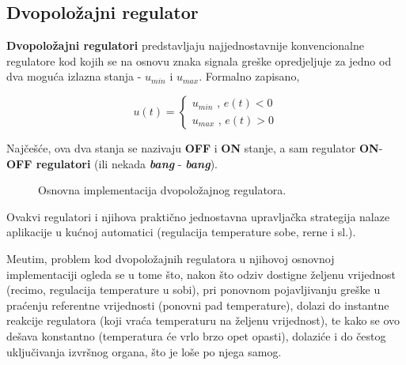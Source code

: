 \documentclass[12pt]{IEEEtran}
\numberwithin{equation}{subsection}
\numberwithin{figure}{section}
\begin{document}
\subsection{\textbf{Dvopolo\v{z}ajni regulator}}

\textbf{Dvopolo\v{z}ajni regulatori} predstavljaju najjednostavnije
konvencionalne regulatore kod kojih se na osnovu znaka signala gre\v{s}ke
opredjeljuje za jedno od dva mogu\'{c}a izlazna stanja - $u_{min}$ i $u_{max}$.
Formalno zapisano,

\begin{equation}
    u(t) = \begin{cases}
        u_{min} \text{ , } e(t) < 0 \\
        u_{max} \text{ , } e(t) > 0
    \end{cases}
\end{equation}

Naj\v{c}e\v{s}\'{c}e, ova dva stanja se nazivaju \textbf{OFF} i \textbf{ON}
stanje, a sam regulator \textbf{ON}-\textbf{OFF regulatori}
(ili nekada \textbf{\textit{bang}} - \textbf{\textit{bang}}).

\begin{figure}[h]
    \centering
    \caption{Osnovna implementacija dvopolo\v{z}ajnog regulatora.}
\end{figure}

Ovakvi regulatori i njihova prakti\v{c}no jednostavna upravlja\v{c}ka
strategija nalaze aplikacije u ku\'{c}noj automatici (regulacija temperature
sobe, rerne i sl.).

Me\dj{}utim, problem kod dvopolo\v{z}ajnih regulatora u njihovoj osnovnoj
implementaciji ogleda se u tome \v{s}to, nakon \v{s}to odziv dostigne \v{z}eljenu
vrijednost (recimo, regulacija temperature u sobi), pri ponovnom pojavljivanju
gre\v{s}ke u pra\'{c}enju referentne vrijednosti (ponovni pad temperature),
dolazi do instantne reakcije regulatora (koji vra\'{c}a
temperaturu na \v{z}eljenu vrijednost), te kako se ovo de\v{s}ava konstantno
(temperatura \'{c}e vrlo brzo opet opasti),
dolazi\'{c}e i do \v{c}estog uklju\v{c}ivanja izvr\v{s}nog organa,
\v{s}to je lo\v{s}e po njega samog.
\end{document}
